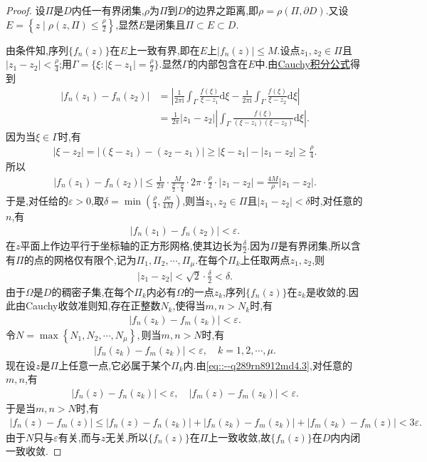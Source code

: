 \documentclass[../../main.tex]{subfiles}%
\begin{document}
\begin{proof}

设$\Pi$是$D$内任一有界闭集,$\rho$为$\Pi$到$D$的边界之距离,即$\rho=\rho(\Pi,\partial D)$.又设$E=\left\{z\mid \rho(z,\Pi)\leqslant \frac{\rho}{2}\right\}$,显然$E$是闭集且$\Pi\subset E\subset D$.

由条件知,序列$\{f_n(z)\}$在$E$上一致有界,即在$E$上$|f_n(z)|\leqslant M$.设点$z_1,z_2\in \Pi$且$|z_1-z_2|<\frac{\rho}{4}$;用$\Gamma=\{\xi :|\xi-z_1|=\frac{\rho}{2}\}$.显然$\Gamma$的内部包含在$E$中.由\hyperref[theorem:定理3.4.1]{Cauchy积分公式}得到
\begin{align*}
|f_n(z_1)-f_n(z_2)|&=\left| \frac{1}{2\pi\text{i}}\int_{\Gamma}\frac{f(\xi)}{\xi-z_1}\mathrm{d}\xi-\frac{1}{2\pi\text{i}}\int_{\Gamma}\frac{f(\xi)}{\xi-z_2}\mathrm{d}\xi \right| \\
&=\frac{1}{2\pi}|z_1-z_2|\left| \int_{\Gamma}\frac{f(\xi)}{(\xi-z_1)(\xi-z_2)}\mathrm{d}\xi \right|.
\end{align*}
因为当$\xi\in \Gamma$时,有
\begin{align*}
|\xi-z_2|=|(\xi-z_1)-(z_2-z_1)|\geqslant |\xi-z_1|-|z_1-z_2|\geqslant \frac{\rho}{4}.
\end{align*}
所以
\begin{align*}
|f_n(z_1)-f_n(z_2)|\leqslant \frac{1}{2\pi}\cdot \frac{M}{\frac{\rho}{2}\cdot \frac{\rho}{4}}\cdot 2\pi\cdot \frac{\rho}{2}\cdot |z_1-z_2| =\frac{4M}{\rho}|z_1-z_2|.
\end{align*}
于是,对任给的$\varepsilon>0$,取$\delta=\min\left( \frac{\rho}{4},\frac{\rho\varepsilon}{4M} \right)$,则当$z_1,z_2\in \Pi$且$|z_1-z_2|<\delta$时,对任意的$n$,有
\begin{align}
|f_n(z_1)-f_n(z_2)|<\varepsilon. \label{eq::--q289rn8912md4.3}
\end{align}
在$z$平面上作边平行于坐标轴的正方形网格,使其边长为$\frac{\delta}{2}$.因为$\Pi$是有界闭集,所以含有$\Pi$的点的网格仅有限个,记为$\Pi_1,\Pi_2,\cdots,\Pi_{\mu}$.在每个$\Pi_k$上任取两点$z_1,z_2$,则
\begin{align*}
|z_1-z_2|<\sqrt{2}\cdot \frac{\delta}{2}<\delta.
\end{align*}
由于$\Omega$是$D$的稠密子集,在每个$\Pi_k$内必有$\Omega$的一点$z_k$,序列$\{f_n(z)\}$在$z_k$是收敛的.因此由Cauchy收敛准则知,存在正整数$N_k$,使得当$m,n>N_k$时,有
\begin{align*}
|f_n(z_k)-f_m(z_k)|<\varepsilon.
\end{align*}
令$N=\max \left\{ N_1,N_2,\cdots ,N_{\mu} \right\} ,$则当$m,n>N$时,有
\begin{align*}
|f_n(z_k)-f_m(z_k)|<\varepsilon,\quad k=1,2,\cdots,\mu.
\end{align*}
现在设$z$是$\Pi$上任意一点,它必属于某个$\Pi_k$内.由\eqref{eq::--q289rn8912md4.3},对任意的$m,n$,有
\begin{align*}
|f_n(z)-f_n(z_k)|<\varepsilon, \quad |f_m(z)-f_m(z_k)|<\varepsilon.
\end{align*}
于是当$m,n>N$时,有
\begin{align*}
|f_n(z)-f_m(z)|\leqslant |f_n(z)-f_n(z_k)|+|f_n(z_k)-f_m(z_k)|+ |f_m(z_k)-f_m(z)|<3\varepsilon.
\end{align*}
由于$N$只与$\varepsilon$有关,而与$z$无关,所以$\{f_n(z)\}$在$\Pi$上一致收敛,故$\{f_n(z)\}$在$D$内内闭一致收敛.


\end{proof}
\end{document}
